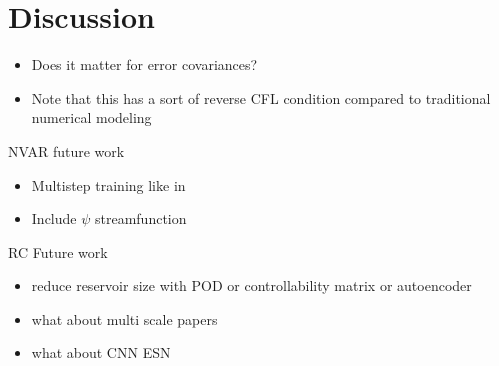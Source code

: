 \section{Discussion}
\label{sec:discussion}

\begin{itemize}
    \item Does it matter for error covariances?
    \item Note that this has a sort of reverse CFL condition compared to
        traditional numerical modeling
\end{itemize}


NVAR future work
\begin{itemize}
    \item Multistep training like in \citep{weyn_improving_2020}
    \item Include $\psi$ streamfunction
\end{itemize}

RC Future work
\begin{itemize}
    \item reduce reservoir size with POD or controllability matrix or
        autoencoder
    \item what about multi scale papers
    \item what about CNN ESN
\end{itemize}
